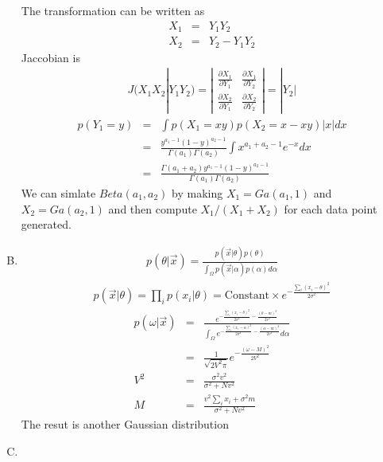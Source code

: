 \documentclass{article}
\begin{document}
\begin{enumerate}[(A)]
The transformation can be written as
\begin{eqnarray}
X_1&=&Y_1Y_2\nonumber\\
X_2&=&Y_2-Y_1Y_2
\end{eqnarray}
Jaccobian is
\begin{eqnarray}
J(X_1 X_2|Y_1 Y_2)=\left|
\begin{array}{cc}
\frac{\partial X_1}{\partial Y_1} & \frac{\partial X_1}{\partial Y_2}  \\
\frac{\partial X_2}{\partial Y_1} & \frac{\partial X_2}{\partial Y_2} 
\end{array} \right|=|Y_2|
\end{eqnarray}
\begin{eqnarray}
p(Y_1=y)&=&\int p(X_1=xy)p(X_2=x-xy)|x|dx\nonumber\\
&=&\frac{y^{a_1-1}(1-y)^{a_2-1}}{\Gamma(a_1)\Gamma(a_2)}\int x^{a_1+a_2-1}e^{-x}dx\nonumber\\
&=&\frac{\Gamma(a_1+a_2)y^{a_1-1}(1-y)^{a_2-1}}{\Gamma(a_1)\Gamma(a_2)}
\end{eqnarray}
We can simlate $Beta(a_1,a_2)$ by making $X_1=Ga(a_1,1)$ and $X_2=Ga(a_2,1)$ and then compute $X_1/(X_1+X_2)$ for each data point generated.

\item

\begin{eqnarray}
p(\theta|\vec{x})=\frac{p(\vec{x}|\theta)p(\theta)}{\int_{\Omega}p(\vec{x}|\alpha)p(\alpha)d\alpha}
\end{eqnarray}
\begin{eqnarray}
p(\vec{x}|\theta)=\prod_ip(x_i|\theta)=\textrm{Constant}\times e^{-\frac{\sum_i(x_i-\theta)^2}{2\sigma^2}}
\end{eqnarray}
\begin{eqnarray}
p(\omega|\vec{x})&=&\frac{e^{-\frac{\sum_i(x_i-\theta)^2}{2\sigma^2}-\frac{(\theta-m)^2}{2v^2}}}{\int_{\Omega} e^{-\frac{\sum_i(x_i-\alpha)^2}{2\sigma^2}-\frac{(\alpha-m)^2}{2v^2}}d\alpha}\nonumber\\
&=&\frac{1}{\sqrt{2V^2\pi}}e^{-\frac{(\omega-M)^2}{2V^2}}\\
V^2&=&\frac{\sigma^2v^2}{\sigma^2+Nv^2}\\
M&=&\frac{v^2\sum_ix_i+\sigma^2m}{\sigma^2+Nv^2}
\end{eqnarray}
The resut is another Gaussian distribution

\item


\end{enumerate}
\end{document}
